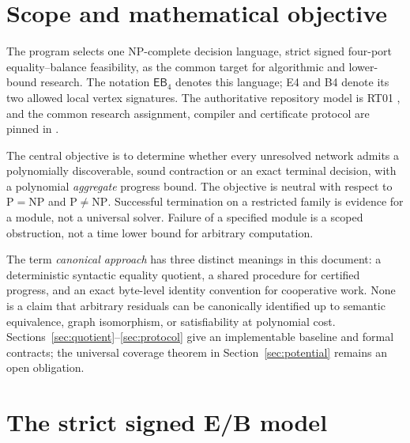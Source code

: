 \documentclass[11pt,letterpaper]{article}
\theoremstyle{definition}
\newcommand{\EB}{\ensuremath{\mathsf{EB}_4}}
\begin{document}
\section{Scope and mathematical objective}\label{sec:scope}
The program selects one NP-complete decision language, strict signed four-port equality--balance feasibility, as the common target for algorithmic and lower-bound research. The notation \(\EB\) denotes this language; E4 and B4 denote its two allowed local vertex signatures. The authoritative repository model is RT01 \cite{rt01}, and the common research assignment, compiler and certificate protocol are pinned in \cite{ebdirective,compiler,identifiers}.

The central objective is to determine whether every unresolved network admits a polynomially discoverable, sound contraction or an exact terminal decision, with a polynomial \emph{aggregate} progress bound. The objective is neutral with respect to \(\mathrm P=\mathrm{NP}\) and \(\mathrm P\ne\mathrm{NP}\). Successful termination on a restricted family is evidence for a module, not a universal solver. Failure of a specified module is a scoped obstruction, not a time lower bound for arbitrary computation.

The term \emph{canonical approach} has three distinct meanings in this document: a deterministic syntactic equality quotient, a shared procedure for certified progress, and an exact byte-level identity convention for cooperative work. None is a claim that arbitrary residuals can be canonically identified up to semantic equivalence, graph isomorphism, or satisfiability at polynomial cost. Sections~\ref{sec:quotient}--\ref{sec:protocol} give an implementable baseline and formal contracts; the universal coverage theorem in Section~\ref{sec:potential} remains an open obligation.

\section{The strict signed E/B model}\label{sec:model}
\end{document}
